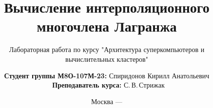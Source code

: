 \title{Вычисление интерполяционного многочлена Лагранжа}

\subtitle{Лабораторная работа по курсу "Архитектура суперкомпьютеров и вычислительных кластеров"}


\author[Спиридонов Кирилл Анатольевич]
{
  \textbf{Студент группы М8О-107М-23:} Спиридонов Кирилл Анатольевич\\
  \ \textbf{Преподаватель курса: } С.\,В.\,Стрижак
}


\date{Москва --- \the\year}

